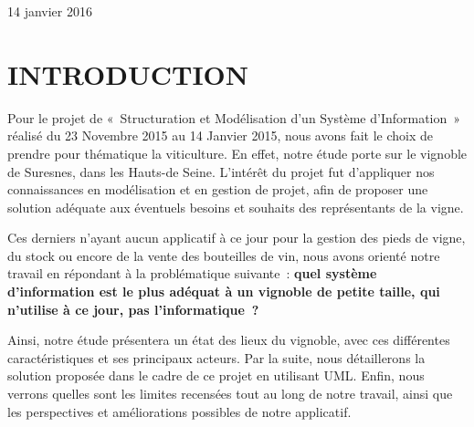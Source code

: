 \documentclass[a4paper, title]{report}
\begin{document}
\begin{titlepage}
\begin{sffamily}
\begin{center}
    \vfill

    {\large 14 janvier 2016}

  \end{center}
  \end{sffamily}
\end{titlepage}



\newpage

\chapter{INTRODUCTION}\label{introduction}

Pour le projet de «~Structuration et Modélisation d'un Système
d'Information~» réalisé du 23 Novembre 2015 au 14 Janvier 2015, nous
avons fait le choix de prendre pour thématique la viticulture. En effet,
notre étude porte sur le vignoble de Suresnes, dans les Hauts-de Seine.
L'intérêt du projet fut d'appliquer nos connaissances en modélisation et
en gestion de projet, afin de proposer une solution adéquate aux
éventuels besoins et souhaits des représentants de la vigne.

Ces derniers n'ayant aucun applicatif à ce jour pour la gestion des
pieds de vigne, du stock ou encore de la vente des bouteilles de vin,
nous avons orienté notre travail en répondant à la problématique
suivante~: \textbf{quel système d'information est le plus adéquat à un
vignoble de petite taille, qui n'utilise à ce jour, pas
l'informatique~?}

Ainsi, notre étude présentera un état des lieux du vignoble, avec ces
différentes caractéristiques et ses principaux acteurs. Par la suite,
nous détaillerons la solution proposée dans le cadre de ce projet en
utilisant UML. Enfin, nous verrons quelles sont les limites recensées
tout au long de notre travail, ainsi que les perspectives et
améliorations possibles de notre applicatif.
\end{document}
